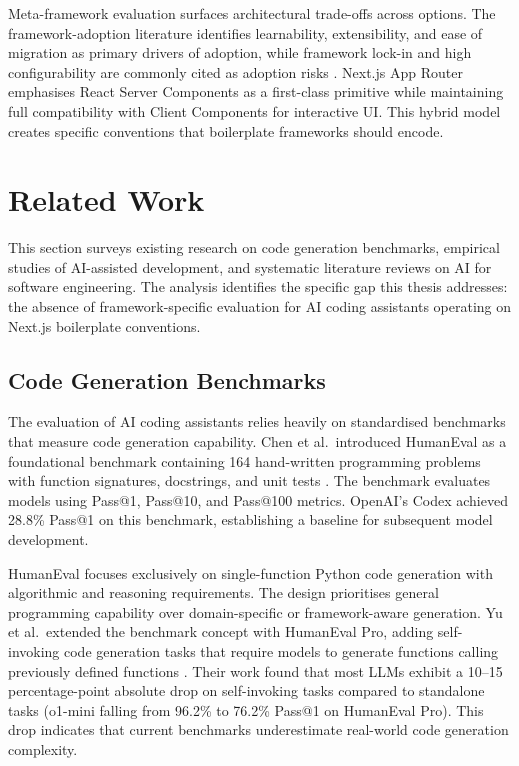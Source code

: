 \documentclass[12pt,a4paper]{report}
\begin{document}
Meta-framework evaluation surfaces architectural trade-offs across options. The framework-adoption literature identifies learnability, extensibility, and ease of migration as primary drivers of adoption, while framework lock-in and high configurability are commonly cited as adoption risks \parencite{storey2016frameworkadoption}. Next.js App Router emphasises React Server Components as a first-class primitive while maintaining full compatibility with Client Components for interactive UI. This hybrid model creates specific conventions that boilerplate frameworks should encode.

\chapter{Related Work}
\label{sec:relatedwork}

This section surveys existing research on code generation benchmarks, empirical studies of AI-assisted development, and systematic literature reviews on AI for software engineering. The analysis identifies the specific gap this thesis addresses: the absence of framework-specific evaluation for AI coding assistants operating on Next.js boilerplate conventions.

\section{Code Generation Benchmarks}

The evaluation of AI coding assistants relies heavily on standardised benchmarks that measure code generation capability. Chen et al.\ introduced HumanEval as a foundational benchmark containing 164 hand-written programming problems with function signatures, docstrings, and unit tests \parencite{chen2021evaluating}. The benchmark evaluates models using Pass@1, Pass@10, and Pass@100 metrics. OpenAI's Codex achieved 28.8\% Pass@1 on this benchmark, establishing a baseline for subsequent model development.

HumanEval focuses exclusively on single-function Python code generation with algorithmic and reasoning requirements. The design prioritises general programming capability over domain-specific or framework-aware generation. Yu et al.\ extended the benchmark concept with HumanEval Pro, adding self-invoking code generation tasks that require models to generate functions calling previously defined functions \parencite{yu2025humanevalpro}. Their work found that most LLMs exhibit a 10--15 percentage-point absolute drop on self-invoking tasks compared to standalone tasks (o1-mini falling from 96.2\% to 76.2\% Pass@1 on HumanEval Pro). This drop indicates that current benchmarks underestimate real-world code generation complexity.
\end{document}
